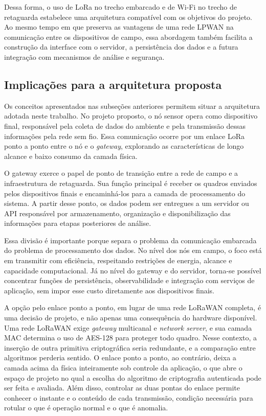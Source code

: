 Dessa forma, o uso de LoRa no trecho embarcado e de Wi-Fi no trecho de retaguarda estabelece uma arquitetura compatível com os objetivos do projeto. Ao mesmo tempo em que preserva as vantagens de uma rede LPWAN na comunicação entre os dispositivos de campo, essa abordagem também facilita a construção da interface com o servidor, a persistência dos dados e a futura integração com mecanismos de análise e segurança.


\subsection{Implicações para a arquitetura proposta}
\label{subsec:implicacoes_arquitetura}

Os conceitos apresentados nas subseções anteriores permitem situar a arquitetura adotada neste trabalho. No projeto proposto, o nó sensor opera como dispositivo final, responsável pela coleta de dados do ambiente e pela transmissão dessas informações pela rede sem fio. Essa comunicação ocorre por um enlace LoRa ponto a ponto entre o nó e o \textit{gateway}, explorando as características de longo alcance e baixo consumo da camada física.

O gateway exerce o papel de ponto de transição entre a rede de campo e a infraestrutura de retaguarda. Sua função principal é receber os quadros enviados pelos dispositivos finais e encaminhá-los para a camada de processamento do sistema. A partir desse ponto, os dados podem ser entregues a um servidor ou API responsável por armazenamento, organização e disponibilização das informações para etapas posteriores de análise.

Essa divisão é importante porque separa o problema da comunicação embarcada do problema de processamento dos dados. No nível dos nós em campo, o foco está em transmitir com eficiência, respeitando restrições de energia, alcance e capacidade computacional. Já no nível do gateway e do servidor, torna-se possível concentrar funções de persistência, observabilidade e integração com serviços de aplicação, sem impor esse custo diretamente aos dispositivos finais.

A opção pelo enlace ponto a ponto, em lugar de uma rede LoRaWAN completa, é uma decisão de projeto, e não apenas uma consequência do hardware disponível. Uma rede LoRaWAN exige \textit{gateway} multicanal e \textit{network server}, e sua camada MAC determina o uso de AES-128 para proteger todo quadro. Nesse contexto, a inserção de outra primitiva criptográfica seria redundante, e a comparação entre algoritmos perderia sentido. O enlace ponto a ponto, ao contrário, deixa a camada acima da física inteiramente sob controle da aplicação, o que abre o espaço de projeto no qual a escolha do algoritmo de criptografia autenticada pode ser feita e avaliada. Além disso, controlar as duas pontas do enlace permite conhecer o instante e o conteúdo de cada transmissão, condição necessária para rotular o que é operação normal e o que é anomalia.

